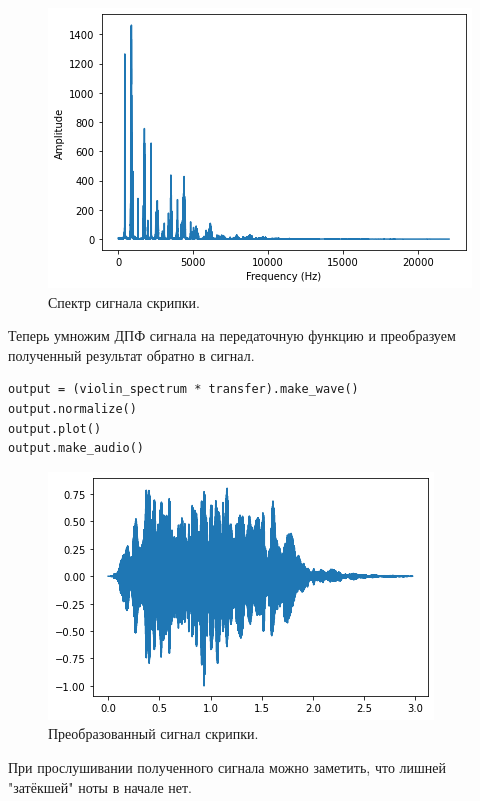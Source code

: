 \documentclass[a4paper, 14pt]{extarticle}
\begin{document}
    \begin{figure}[H]
        \centering
        \includegraphics[width=0.7\linewidth]{resources/Images/task1_violin_spectrum}
        \caption{Спектр сигнала скрипки.}
        \label{fig:task1_violin_spectrum}
    \end{figure}

    Теперь умножим ДПФ сигнала на передаточную функцию и преобразуем полученный результат обратно в сигнал.

    \begin{lstlisting}[caption= Умножение ДПФ сигнала на передаточную функцию., label={lst:task1_violin_result}]
output = (violin_spectrum * transfer).make_wave()
output.normalize()
output.plot()
output.make_audio() \end{lstlisting}

    \begin{figure}[H]
        \centering
        \includegraphics[width=0.8\linewidth]{resources/Images/task1_violin_result}
        \caption{Преобразованный сигнал скрипки.}
        \label{fig:task1_violin_result}
    \end{figure}

    При прослушивании полученного сигнала можно заметить, что лишней "затёкшей" ноты в начале нет.
\end{document}

